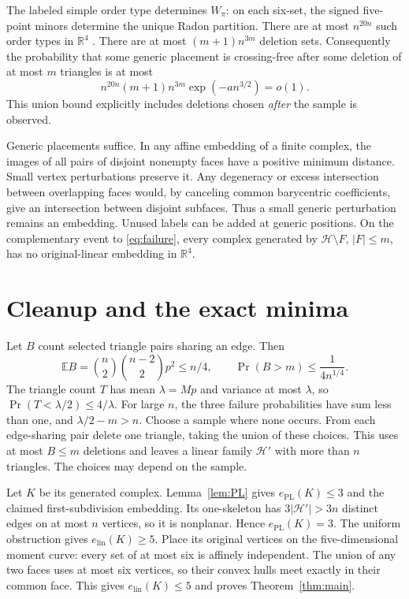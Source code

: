 \documentclass[11pt]{article}
\newcommand{\R}{\mathbb R}
\newcommand{\PL}{\mathrm{PL}}
\newcommand{\lin}{\mathrm{lin}}
\begin{document}
The labeled simple order type determines $W_\pi$: on each six-set,
the signed five-point minors determine the unique Radon partition.
There are at most $n^{20n}$ such order types in $\R^4$
\cite{GP86,Newman23}. There are at most $(m+1)n^{3m}$ deletion sets.
Consequently the probability that some generic placement is
crossing-free after some deletion of at most $m$ triangles is at most
\begin{equation}\label{eq:failure}
n^{20n}(m+1)n^{3m}\exp(-a n^{3/2})=o(1).
\end{equation}
This union bound explicitly includes deletions chosen \emph{after}
the sample is observed.

Generic placements suffice. In any affine embedding of a finite
complex, the images of all pairs of disjoint nonempty faces have a
positive minimum distance. Small vertex perturbations preserve it.
Any degeneracy or excess intersection between overlapping faces
would, by canceling common barycentric coefficients, give an
intersection between disjoint subfaces. Thus a small generic
perturbation remains an embedding. Unused labels can be added at
generic positions. On the complementary event to \eqref{eq:failure},
every complex generated by $\mathcal H\setminus F$, $|F|\le m$,
has no original-linear embedding in $\R^4$.

\section{Cleanup and the exact minima}
Let $B$ count selected triangle pairs sharing an edge. Then
\[
\mathbb EB=\binom n2\binom{n-2}2p^2\le n/4,\qquad
\Pr(B>m)\le\frac1{4n^{1/4}}.
\]
The triangle count $T$ has mean $\lambda=Mp$ and variance at most
$\lambda$, so $\Pr(T<\lambda/2)\le4/\lambda$.
For large $n$, the three failure probabilities have sum less than
one, and $\lambda/2-m>n$.
Choose a sample where none occurs. From each edge-sharing pair
delete one triangle, taking the union of these choices.
This uses at most $B\le m$ deletions and leaves a linear family
$\mathcal H'$ with more than $n$ triangles.
The choices may depend on the sample.

Let $K$ be its generated complex. Lemma~\ref{lem:PL} gives
$e_{\PL}(K)\le3$ and the claimed first-subdivision embedding.
Its one-skeleton has $3|\mathcal H'|>3n$ distinct edges on at most
$n$ vertices, so it is nonplanar. Hence $e_{\PL}(K)=3$.
The uniform obstruction gives $e_{\lin}(K)\ge5$.
Place its original vertices on the five-dimensional moment curve:
every set of at most six is affinely independent. The union of any
two faces uses at most six vertices, so their convex hulls meet
exactly in their common face. This gives $e_{\lin}(K)\le5$ and proves
Theorem~\ref{thm:main}.
\end{document}
